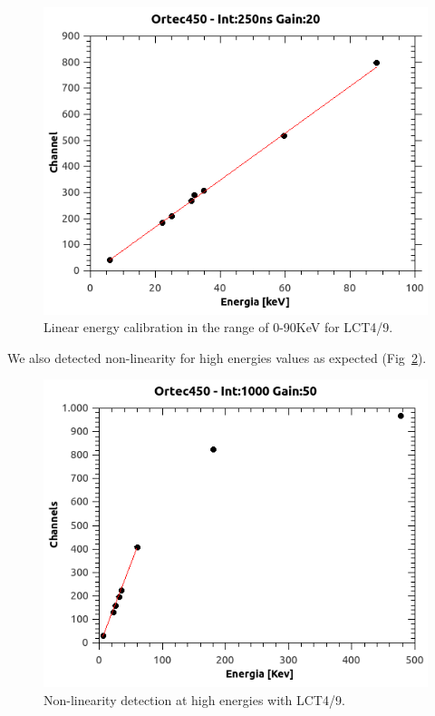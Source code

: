 \documentclass[10pt,a4paper, openany]{book}
\begin{document}
\begin{figure}[!h]
\begin{center}
\includegraphics[scale=0.45]{imm/lin.png}
\end{center}
\caption{Linear energy calibration in the range of 0-90KeV for LCT4/9.}
\label{fig:lin}
\end{figure}

We also detected non-linearity for high energies values as expected (Fig~\ref{fig:nl}).
\begin{figure}[!h]
\begin{center}
\includegraphics[scale=0.5]{imm/1000_50_fit.png}
\end{center}
\caption{Non-linearity detection at high energies with LCT4/9.}
\label{fig:nl}
\end{figure}
\newpage
\end{document}
